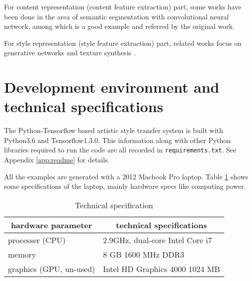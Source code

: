 For content representation (content feature extraction) part,
some works have been done in the area of semantic segmentation with convolutional neural network,
among which \cite{Long:2014um} is a good example and referred by the original work.

For style representation (style feature extraction) part,
related works focus on generative networks and texture synthesis \cite{gatys2015texture, Ulyanov:2016tw}.



\section{Development environment and technical specifications}
\label{sec:intro:spec}

The Python-Tensorflow based artistic style transfer system
is built with Python3.6 and Tensorflow1.3.0.
This information along with other Python libraries required to run the code
are all recorded in \texttt{requirements.txt}.
See Appendix \ref{app:readme} for details.

All the examples are generated with a 2012 Macbook Pro laptop.
Table \ref{table:spec} shows some specifications of the laptop,
mainly hardware specs like computing power.

    \begin{table}[!htb]
    \center
    \begin{tabular}{l|l}
    \hline
    \multicolumn{1}{c|}{hardware parameter} & \multicolumn{1}{c}{technical specifications} \\ \hline
    processer (CPU) & 2.9GHz, dual-core Intel Core i7 \\
    memory & 8 GB 1600 MHz DDR3 \\
    graphics (GPU, un-used) & Intel HD Graphics 4000 1024 MB \\
    \hline
    \end{tabular}
    \caption{Technical specification}
    \label{table:spec}
    \end{table}
